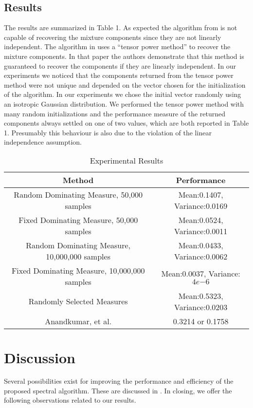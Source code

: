 \documentclass[aos,preprint]{imsart}
\theoremstyle{plain}
\theoremstyle{defintion}
\begin{document}
		\subsection{Results}
		The results are summarized in Table 1. As expected the algorithm from \cite{anandkumar14} is not capable of recovering the mixture components since they are not linearly independent. The algorithm in \cite{anandkumar14} uses a ``tensor power method'' to recover the mixture components. In that paper the authors demonstrate that this method is guaranteed to recover the components if they are linearly independent. In our experiments we noticed that the components returned from the tensor power method were not unique and depended on the vector chosen for the initialization of the algorithm. In our experiments we chose the initial vector randomly using an isotropic Gaussian distribution. We performed the tensor power method with many random initializations and the performance measure of the returned components always settled on one of two values, which are both reported in Table 1. Presumably this behaviour is also due to the violation of the linear independence assumption.
                \begin{table*}[!tb] \label{tab:resutls}
		\caption{Experimental Results}
		\hfill{}
		\begin{center}
			\begin{tabular}{| *{2}{c|}}
				\hline
				Method &Performance\\
				\hline
				Random Dominating Measure, 50,000 samples& Mean:0.1407, Variance:0.0169\\
				\hline
				Fixed Dominating Measure, 50,000 samples & Mean:0.0524, Variance:0.0011\\
				\hline
				Random Dominating Measure, 10,000,000 samples & Mean:0.0433, Variance:0.0062\\
				\hline
                                Fixed Dominating Measure, 10,000,000 samples & Mean:0.0037, Variance: $4e{-6}$\\
				\hline
				Randomly Selected Measures& Mean:0.5323, Variance:0.0203\\
				\hline
				Anandkumar, et al. \cite{anandkumar14}& 0.3214 or 0.1758\\
				\hline
			\end{tabular}
		\end{center}
		\hfill{}
	\end{table*}


	\section{Discussion}\label{sec:discussion}
	Several possibilities exist for improving the performance and efficiency of the proposed spectral algorithm. These are discussed in \cite{arxiv16}. In closing, we offer the following observations related to our results.
\end{document}
